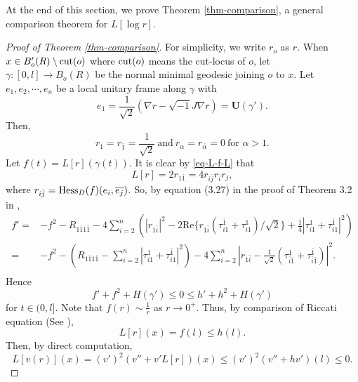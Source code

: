 \documentclass[12pt]{amsart}
\def\ol{\overline}
\def\a{{\alpha}}
\def\ba{{\bar\a}}
\def\cut{{\rm cut}}
\def\ol{\overline}
\def\a{{\alpha}}
\def\ii{{\sqrt{-1}}}
\theoremstyle{definition}
\theoremstyle{remark}
\numberwithin{equation}{section}
\def\bi{{\bar i}}
\def\Hess{{\rm Hess}}
\begin{document}
At the end of this section, we prove Theorem \ref{thm-comparison}, a general comparison theorem for $L[\log r]$.
\begin{proof}[Proof of Theorem \ref{thm-comparison}]
For simplicity, we write $r_o$ as $r$. When $x\in B_o'(R)\setminus\cut(o)$ where $\cut(o)$ means the cut-locus of $o$, let $\gamma:[0,l]\to B_o(R)$ be the normal minimal geodesic joining $o$ to $x$. Let $e_1,e_2,\cdots,e_n$ be a local unitary frame along $\gamma$ with $$e_1=\frac1{\sqrt 2}(\nabla r-\ii J\nabla r)=\mathbf U(\gamma').$$
Then,
\begin{equation}
r_1=r_{\bar 1}=\frac{1}{\sqrt 2}\ \mbox{and}\ r_\a=r_\ba=0\ \mbox{for $\alpha>1$.}
\end{equation}
Let $f(t)=L[r](\gamma(t))$. It is clear by \eqref{eq-L-f-L} that
$$L[r]=2r_{1\bar 1}=4r_{i\bar j}r_{\bi} r_j,$$
where $r_{i\bar j}=\Hess_D(f)(e_i,\ol{e_j})$. So, by equation (3.27) in the proof of Theorem 3.2 in \cite{Yu2},
\begin{equation}\label{eq-f}
\begin{split}
f'=&-f^2-R_{1\bar 1 1\bar 1}-4\sum_{i=2}^n\left(|r_{1\bi}|^2-2\mbox{Re}\{r_{1\bi}(\tau_{i1}^{\bar 1}+\tau_{i1}^1)/\sqrt 2\}+\frac{1}{4}|\tau_{i1}^1+\tau_{i1}^{\bar 1}|^2\right)\\
=&-f^2-\left(R_{1\bar 1 1\bar 1}-\sum_{i=2}^n|\tau_{i1}^1+\tau_{i1}^{\bar 1}|^2\right)-4\sum_{i=2}^n\left|r_{1\bar i}-\frac{1}{\sqrt 2}(\tau_{\bi\bar 1}^{ 1}+\tau_{\bi\bar1}^{\bar1})\right|^2.\\
\end{split}
\end{equation}
Hence
\begin{equation}
f'+f^2+H(\gamma')\leq 0\leq h'+h^2+H(\gamma')
\end{equation}
for $t\in (0,l]$. Note that $f(r)\sim\frac1r$ as $r\to0^+$. Thus, by comparison of Riccati equation (See \cite{Ro}),
\begin{equation}
L[r](x)=f(l)\leq h(l).
\end{equation}
Then, by direct computation,
\begin{equation}
L[v(r)](x)=(v')^2(v''+v'L[r])(x)\leq (v')^2(v''+h v')(l)\leq 0.
\end{equation}


\end{proof}
\end{document}
